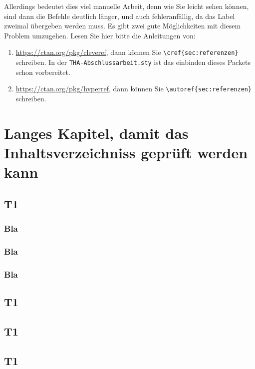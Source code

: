 Allerdings bedeutet dies viel manuelle Arbeit, denn wie Sie leicht
sehen können, sind dann die Befehle deutlich länger, und auch
fehleranfällig, da das Label zweimal übergeben werden muss. Es gibt
zwei gute Möglichkeiten mit diesem Problem umzugehen. Lesen Sie hier
bitte die Anleitungen von:
\begin{enumerate}
\item \url{https://ctan.org/pkg/cleveref}, dann können Sie \verb|\cref{sec:referenzen}| schreiben.
  In der \verb|THA-Abschlussarbeit.sty| ist das einbinden dieses Packets schon vorbereitet. 
\item \url{https://ctan.org/pkg/hyperref}, dann können Sie \verb|\autoref{sec:referenzen}| schreiben.
\end{enumerate}



\chapter{Langes Kapitel, damit das Inhaltsverzeichniss geprüft werden kann}
\section{T1}
\subsection{Bla}

\blindtext

\subsection{Bla}
\blindtext

\subsection{Bla}
\blindtext

\section{T1}
\blindtext

\section{T1}
\blindtext

\section{T1}
\blindtext


